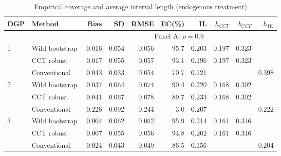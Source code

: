 \documentclass[12pt,]{article}
\DeclareMathOperator{\1}{\mathbbm{1}}
\begin{document}
\begin{table}[ht]
	\begin{threeparttable}
		\caption{Empirical coverage and average interval length (endogenous treatment)}
		\label{tb: endogeneity simulation}
		\begin{tabular}{llrrrrrrrr}
			\hline
			DGP & Method & Bias & SD & RMSE & EC(\%) & IL & $h_{CCT}$ & $b_{CCT}$ & $h_{IK}$ \\ 
			\hline
			&& \multicolumn{8}{c}{Panel A: $\rho = 0.9$} \\ \cline{3-10}
			1 & Wild bootstrap & 0.016 & 0.054 & 0.056 & 95.7 & 0.203 & 0.197 & 0.323 &  \\ 
			& CCT robust & 0.017 & 0.055 & 0.057 & 93.1 & 0.196 & 0.197 & 0.323 &  \\ 
			& Conventional & 0.043 & 0.033 & 0.054 & 70.7 & 0.121 &  &  & 0.398 \\ 
			2 & Wild bootstrap & 0.037 & 0.064 & 0.074 & 90.4 & 0.220 & 0.168 & 0.302 &  \\ 
			& CCT robust & 0.041 & 0.067 & 0.078 & 89.7 & 0.233 & 0.168 & 0.302 &  \\ 
			& Conventional & 0.226 & 0.092 & 0.244 & 3.0 & 0.207 &  &  & 0.222 \\ 
			3 & Wild bootstrap & 0.004 & 0.062 & 0.062 & 95.9 & 0.214 & 0.161 & 0.316 &  \\ 
			& CCT robust & 0.007 & 0.055 & 0.056 & 94.8 & 0.202 & 0.161 & 0.316 &  \\ 
			& Conventional & -0.024 & 0.043 & 0.049 & 86.5 & 0.156 &  &  & 0.204 \\ 
			

\end{tabular}
\end{threeparttable}
\end{table}
\end{document}
